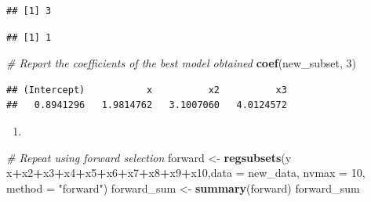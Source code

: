 \documentclass[]{article}
\newenvironment{Shaded}{\begin{snugshade}}{\end{snugshade}}
\newcommand{\KeywordTok}[1]{\textcolor[rgb]{0.13,0.29,0.53}{\textbf{#1}}}
\newcommand{\DataTypeTok}[1]{\textcolor[rgb]{0.13,0.29,0.53}{#1}}
\newcommand{\DecValTok}[1]{\textcolor[rgb]{0.00,0.00,0.81}{#1}}
\newcommand{\StringTok}[1]{\textcolor[rgb]{0.31,0.60,0.02}{#1}}
\newcommand{\CommentTok}[1]{\textcolor[rgb]{0.56,0.35,0.01}{\textit{#1}}}
\newcommand{\OperatorTok}[1]{\textcolor[rgb]{0.81,0.36,0.00}{\textbf{#1}}}
\newcommand{\NormalTok}[1]{#1}
\begin{document}
\begin{Shaded}
\end{Shaded}

\begin{verbatim}
## [1] 3
\end{verbatim}

\begin{Shaded}
\end{Shaded}

\begin{verbatim}
## [1] 1
\end{verbatim}

\begin{Shaded}
\begin{Highlighting}[]
\CommentTok{# Report the coefficients of the best model obtained}
\KeywordTok{coef}\NormalTok{(new_subset, }\DecValTok{3}\NormalTok{)}
\end{Highlighting}
\end{Shaded}

\begin{verbatim}
## (Intercept)           x          x2          x3 
##   0.8941296   1.9814762   3.1007060   4.0124572
\end{verbatim}

\begin{enumerate}
\def\labelenumi{(\alph{enumi})}
\setcounter{enumi}{3}
\item
\end{enumerate}

\begin{Shaded}
\begin{Highlighting}[]
\CommentTok{# Repeat using forward selection}
\NormalTok{forward <-}\StringTok{ }\KeywordTok{regsubsets}\NormalTok{(y }\OperatorTok{~}\StringTok{ }\NormalTok{x}\OperatorTok{+}\NormalTok{x2}\OperatorTok{+}\NormalTok{x3}\OperatorTok{+}\NormalTok{x4}\OperatorTok{+}\NormalTok{x5}\OperatorTok{+}\NormalTok{x6}\OperatorTok{+}\NormalTok{x7}\OperatorTok{+}\NormalTok{x8}\OperatorTok{+}\NormalTok{x9}\OperatorTok{+}\NormalTok{x10,}\DataTypeTok{data =}\NormalTok{ new_data, }\DataTypeTok{nvmax =} \DecValTok{10}\NormalTok{, }\DataTypeTok{method =} \StringTok{"forward"}\NormalTok{)}
\NormalTok{forward_sum <-}\StringTok{ }\KeywordTok{summary}\NormalTok{(forward)}
\NormalTok{forward_sum}
\end{Highlighting}
\end{Shaded}
\end{document}
